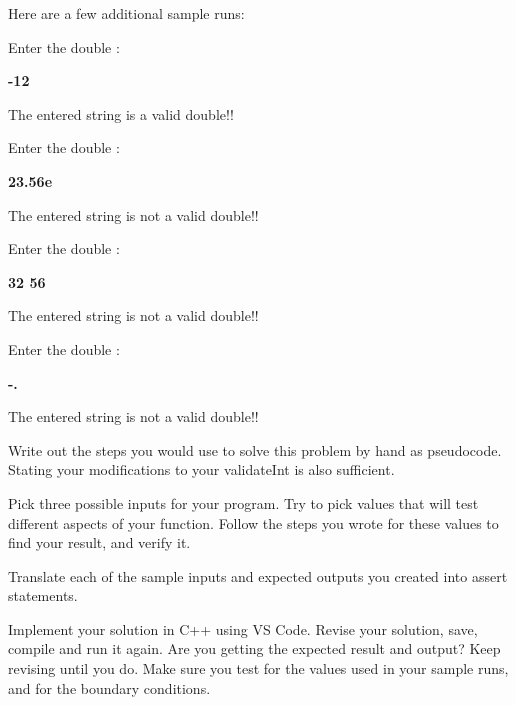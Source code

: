 Here are a few additional sample runs:

\begin{sample}
Enter the double :

\textbf{-12}

The entered string is a valid double!!
\end{sample}

\begin{sample}
Enter the double :

\textbf{23.56e}

The entered string is not a valid double!!
\end{sample}

\begin{sample}
Enter the double :

\textbf{32 56}

The entered string is not a valid double!!
\end{sample}

\begin{sample}
Enter the double :

\textbf{-.}

The entered string is not a valid double!!
\end{sample}

\begin{multipart}
Write out the steps you would use to solve this problem by hand as pseudocode. Stating your modifications to your validateInt is also sufficient.
\end{multipart}

\vspace{8cm}

\begin{multipart}
Pick three possible inputs for your program. Try to pick values that will test different aspects of your function. Follow the steps you wrote for these values to find your result, and verify it.
\end{multipart}

\vspace{10cm}

\begin{multipart}
Translate each of the sample inputs and expected outputs you created into assert statements.
\end{multipart}

\vspace{8cm} 

\begin{multipart}
 Implement your solution in C++ using VS Code. Revise your solution, save, compile and run it again. Are you getting the expected result and output? Keep revising until you do. Make sure you test for the values used in your sample runs, and for the boundary conditions.
\end{multipart}


